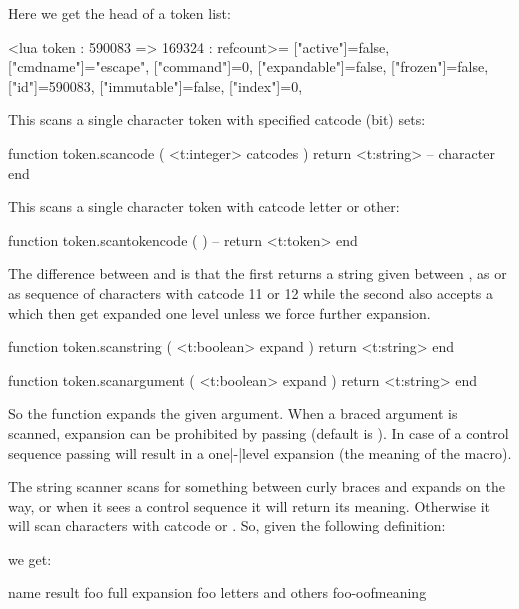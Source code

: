 Here we get the head of a token list:

\starttyping[option=LUA]
<lua token : 590083 => 169324 : refcount>={
 ["active"]=false,
 ["cmdname"]="escape",
 ["command"]=0,
 ["expandable"]=false,
 ["frozen"]=false,
 ["id"]=590083,
 ["immutable"]=false,
 ["index"]=0,
}
\stoptyping

This scans a single character token with specified catcode (bit) sets:

\starttyping[option=LUA]
function token.scancode ( <t:integer> catcodes )
    return <t:string> -- character
end
\stoptyping

This scans a single character token with catcode letter or other:

\starttyping[option=LUA]
function token.scantokencode ( )
    -- return <t:token>
end
\stoptyping

The difference between  and  is that the
first returns a string given between \type {{}}, as \type {\macro} or as sequence
of characters with catcode 11 or 12 while the second also accepts a \type {\cs}
which then get expanded one level unless we force further expansion.

\starttyping[option=LUA]
function token.scanstring ( <t:boolean> expand )
    return <t:string>
end

function token.scanargument ( <t:boolean> expand )
    return <t:string>
end
\stoptyping

So the  function expands the given argument. When a braced
argument is scanned, expansion can be prohibited by passing 
(default is ). In case of a control sequence passing 
will result in a one|-|level expansion (the meaning of the macro).

The string scanner scans for something between curly braces and expands on the
way, or when it sees a control sequence it will return its meaning. Otherwise it
will scan characters with catcode  or . So, given the
following definition:

\startbuffer
\def\oof{oof}
\def\foo{foo-\oof}
\stopbuffer

\typebuffer \getbuffer

we get:

\starttabulate[|l|Tl|l|]
\FL
\BC name \BC result \NC \NR
\TL
\NC {} \NC {} {foo} \NC full expansion \NC \NR
\NC {}   \NC {} foo   \NC letters and others \NC \NR
\NC \type {\directlua{token.scanstring()}\foo}  \NC {}\foo   \NC meaning \NC \NR
\LL
\stoptabulate

